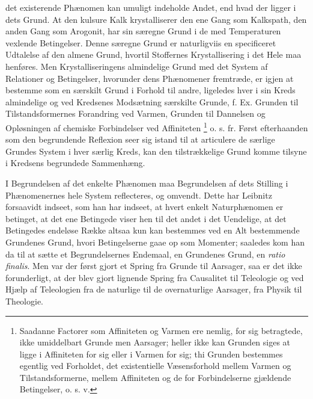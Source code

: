 \documentclass[11pt]{book}
\newcommand{\opage}[1]{\marginnote{\footnotesize\textit{[#1]}}}
\begin{document}
det existerende Phænomen kan umuligt indeholde Andet, end hvad der
ligger i dets Grund.
\opage{103} \setcounter{footnote}{0}%
At den kulsure Kalk krystalliserer den ene Gang som Kalkspath, den
anden Gang som Arogonit, har sin særegne Grund i de med
Temperaturen vexlende Betingelser. Denne særegne Grund er
naturligviis en specificeret Udtalelse af den almene Grund, hvortil
Stoffernes Krystallisering i det Hele maa henføres. Men
Krystalliseringens almindelige Grund med det System af Relationer
og Betingelser, hvorunder dens Phænomener fremtræde, er igjen at
bestemme som en særskilt Grund i Forhold til andre, ligeledes hver
i sin Kreds almindelige og ved Kredsenes Modsætning særskilte
Grunde, f. Ex. Grunden til Tilstandsformernes Forandring ved
Varmen, Grunden til Dannelsen og Opløsningen af chemiske
Forbindelser ved Affiniteten%
\footnote{Saadanne Factorer som Affiniteten og Varmen ere nemlig,
for sig betragtede, ikke umiddelbart Grunde men Aarsager; heller
ikke kan Grunden siges at ligge i Affiniteten for sig eller i
Varmen for sig; thi Grunden bestemmes egentlig ved Forholdet, det
existentielle Væsensforhold mellem Varmen og Tilstandsformerne,
mellem Affiniteten og de for Forbindelserne gjældende Betingelser,
o. s. v.} o. s. fr. Først efterhaanden som den begrundende
Reflexion seer sig istand til at articulere de særlige Grundes
System i hver særlig Kreds, kan den tilstrækkelige Grund komme
tilsyne i Kredsens begrundede Sammenhæng.

I Begrundelsen af det enkelte Phænomen maa Begrundelsen af dets
Stilling i Phænomenernes hele System reflecteres, og omvendt. Dette
har Leibnitz forsaavidt indseet, som han har indseet, at hvert
enkelt Naturphænomen er betinget, at det ene Betingede viser hen
til det andet i det Uendelige, at det Betingedes endeløse Række
altsaa kun kan bestemmes ved en Alt bestemmende Grundenes Grund,
hvori Betingelserne gaae op som Momenter; saaledes kom han da til
at sætte et Begrundelsernes Endemaal, en Grundenes Grund, en
\textit{ratio finalis}. Men var der først gjort et Spring fra
Grunde til Aarsager, saa er det ikke forunderligt, at der blev
gjort lignende Spring fra Causalitet
\opage{104} \setcounter{footnote}{0}%
til Teleologie og ved Hjælp af Teleologien fra de naturlige til de
overnaturlige Aarsager, fra Physik til Theologie.
\end{document}
